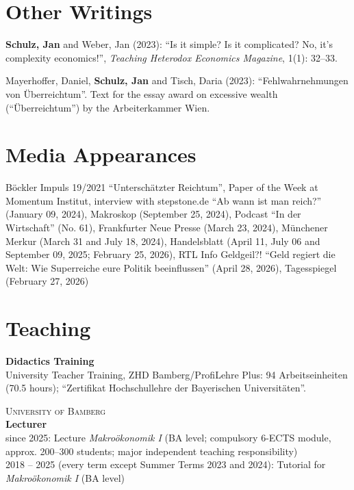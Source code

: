 \documentclass[margin]{res}
\begin{document}
\begin{resume}
	
	
	\section{Other Writings} 
	\textbf{Schulz, Jan} and Weber, Jan (2023): ``Is it simple? Is it complicated? No, it's complexity economics!'', \emph{Teaching Heterodox Economics Magazine}, 1(1): 32--33.
	
	Mayerhoffer, Daniel, \textbf{Schulz, Jan} and Tisch, Daria (2023): ``Fehlwahrnehmungen von \"Uberreichtum''. Text for the essay award on excessive wealth (``\"Uberreichtum'') by the Arbeiterkammer Wien.
	
	\section{Media Appearances} 
	B\"ockler Impuls 19/2021 ``Untersch\"atzter Reichtum'', Paper of the Week at Momentum Institut, interview with stepstone.de ``Ab wann ist man reich?'' (January 09, 2024), Makroskop (September 25, 2024), Podcast ``In der Wirtschaft'' (No. 61), Frankfurter Neue Presse (March 23, 2024), M\"unchener Merkur (March 31 and July 18, 2024), Handelsblatt (April 11, July 06 and September 09, 2025; February 25, 2026), RTL Info Geldgeil?! ``Geld regiert die Welt: Wie Superreiche eure Politik beeinflussen'' (April 28, 2026), Tagesspiegel (February 27, 2026)
	\newpage
	\section{Teaching} \textbf{Didactics Training}\\
	University Teacher Training, ZHD Bamberg/ProfiLehre Plus: 94 Arbeitseinheiten (70.5 hours); ``Zertifikat Hochschullehre der Bayerischen Universit\"aten''.
	
	\textsc{University of Bamberg} \\
	\textbf{Lecturer} \\
	since 2025: Lecture \textit{Makro\"okonomik I} (BA level; compulsory 6-ECTS module, approx. 200--300 students; major independent teaching responsibility)\\
	2018 -- 2025 (every term except Summer Terms 2023 and 2024): Tutorial for \textit{Makro\"okonomik I} (BA level)
	

\end{resume}
\end{document}
